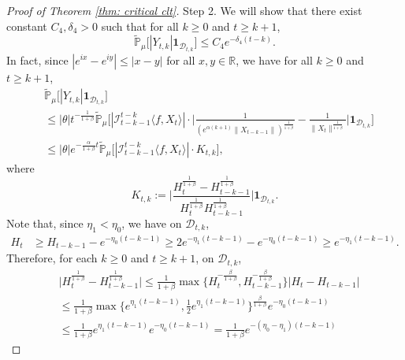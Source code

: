 \documentclass[12pt,a4paper]{amsart}
\theoremstyle{plain}
\theoremstyle{definition}
\numberwithin{equation}{section}
\begin{document}
\begin{proof}[Proof of Theorem \ref{thm: critical clt}]
    Step 2. We will show that there exist constant $C_4,\delta_4 > 0$ such that for all $k\geq 0$ and $t\geq k+1$,
\begin{equation}
\label{thm122}
    \mathbb{\tilde{P}}_{\mu}\big[|Y_{t,k}|\mathbf{1}_{\mathcal{D}_{t,k}}\big]
    \leq  C_4 e^{-\delta_4 (t-k)}.
\end{equation}
    In fact, since $|e^{ix}-e^{iy}|\leq|x-y|$ for all $x,y\in \mathbb R$, we have for all $k \geq 0$ and $t\geq k+1$,
\begin{align}
\label{eq: control of Ykt}
    &\mathbb{\tilde{P}}_{\mu}\big[|Y_{t,k}|\mathbf{1}_{\mathcal{D}_{t,k}}\big]
    \\&\leq|\theta|t^{-\frac{1}{1+\beta}} \mathbb{\tilde{P}}_{\mu}\bigg[|\mathcal I_{t-k-1}^{t-k}\langle f ,X_t\rangle|\cdot\Big|\frac{1}{(e^{\alpha(k+1)}\|X_{t-k-1}\|)^{\frac{1}{1+\beta}}}-\frac{1}{\|X_t\|^{\frac{1}{1+\beta}}}\Big|\mathbf{1}_{\mathcal{D}_{t,k}}\bigg]
    \\&\leq |\theta| e^{-\frac{\alpha}{1+\beta}t}\mathbb{\tilde{P}}_{\mu}\big[|\mathcal I_{t-k-1}^{t-k}\langle f ,X_t\rangle|\cdot K_{t,k}\big],
\end{align}
    where
\begin{equation}
\label{def: Ktk}
    K_{t,k}
    :=\Big|\frac{H_t^{\frac{1}{1+\beta}}-H_{t-k-1}^{\frac{1}{1+\beta}}}{H_t^{\frac{1}{1+\beta}}H_{t-k-1}^{\frac{1}{1+\beta}}}\Big|\mathbf{1}_{\mathcal{D}_{t,k}}.
\end{equation}
    Note that, since $\eta_1 < \eta_0$, we have on $\mathcal D_{t,k}$,
\begin{align}
    H_t
    &\geq H_{t-k-1}- e^{-\eta_0(t-k-1)}
    \geq 2e^{-\eta_1(t-k-1)}-e^{-\eta_0(t-k-1)}
    \geq e^{-\eta_1(t-k-1)}.
\end{align}
    Therefore, for each $k \geq 0$ and $t\geq k+1$,  on $\mathcal D_{t,k}$,
\begin{align}
    &\Big|H_t^{\frac{1}{1+\beta}}-H_{t-k-1}^{\frac{1}{1+\beta}}\Big|
    \leq \frac{1}{1+\beta}\max \Big\{H_t^{-\frac{\beta}{1+\beta}},H_{t-k-1}^{-\frac{\beta}{1+\beta}}\Big\}\left|H_t-H_{t-k-1}\right|
    \\&\leq \frac{1}{1+\beta} \max\{e^{\eta_1 (t-k-1)}, \frac{1}{2}e^{\eta_1(t-k-1)}\}^{\frac{\beta}{1+\beta}}e^{-\eta_0(t-k-1)}
    \\&\leq \frac{1}{1+\beta} e^{\eta_1 (t-k-1)} e^{-\eta_0(t-k-1)}
    =\frac{1}{1+\beta}  e^{-(\eta_0 - \eta_1)(t-k-1)}
\end{align}

\end{proof}
\end{document}
